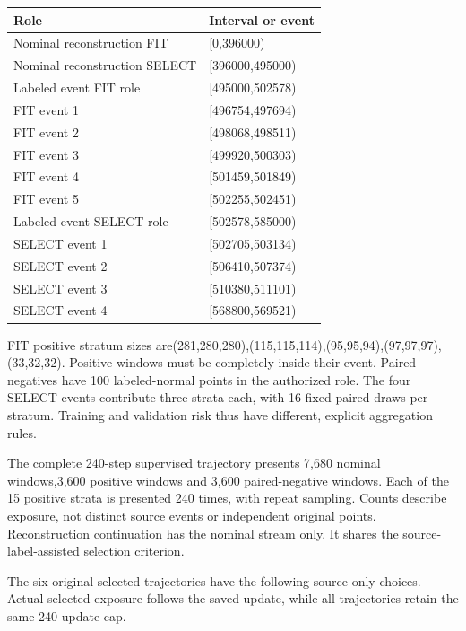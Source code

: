 \documentclass[
  english,
  9pt,
]{article}
\begin{document}
\begin{longtable}[]{@{}ll@{}}
\toprule\noalign{}
Role & Interval or event \\
\midrule\noalign{}
\endhead
\bottomrule\noalign{}
\endlastfoot
Nominal reconstruction FIT & {[}0,396000) \\
Nominal reconstruction SELECT & {[}396000,495000) \\
Labeled event FIT role & {[}495000,502578) \\
FIT event 1 & {[}496754,497694) \\
FIT event 2 & {[}498068,498511) \\
FIT event 3 & {[}499920,500303) \\
FIT event 4 & {[}501459,501849) \\
FIT event 5 & {[}502255,502451) \\
Labeled event SELECT role & {[}502578,585000) \\
SELECT event 1 & {[}502705,503134) \\
SELECT event 2 & {[}506410,507374) \\
SELECT event 3 & {[}510380,511101) \\
SELECT event 4 & {[}568800,569521) \\
\end{longtable}

FIT positive stratum sizes
are(281,280,280),(115,115,114),(95,95,94),(97,97,97),(33,32,32).
Positive windows must be completely inside their event. Paired negatives
have 100 labeled-normal points in the authorized role. The four SELECT
events contribute three strata each, with 16 fixed paired draws per
stratum. Training and validation risk thus have different, explicit
aggregation rules.

The complete 240-step supervised trajectory presents 7,680 nominal
windows,3,600 positive windows and 3,600 paired-negative windows. Each
of the 15 positive strata is presented 240 times, with repeat sampling.
Counts describe exposure, not distinct source events or independent
original points. Reconstruction continuation has the nominal stream
only. It shares the source-label-assisted selection criterion.

The six original selected trajectories have the following source-only
choices. Actual selected exposure follows the saved update, while all
trajectories retain the same 240-update cap.
\end{document}
